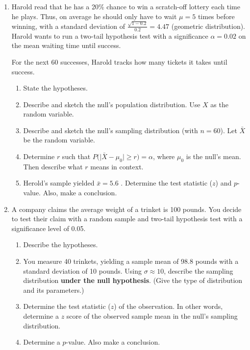\documentclass[12pt,letterpaper]{article}
\begin{document}
\begin{enumerate}
\newpage


\item Harold read that he has a 20\% chance to win a scratch-off lottery each time he plays. Thus, on average he should only have to wait $\mu=5$ times before winning, with a standard deviation of $\frac{\sqrt{1-0.2}}{0.2}=4.47$ (geometric distribution). Harold wants to run a two-tail hypothesis test with a significance $\alpha=0.02$ on the mean waiting time until success. 

For the next 60 successes, Harold tracks how many tickets it takes until success. 

\begin{enumerate}
\item State the hypotheses.
\vfill
\item Describe and sketch the null's population distribution. Use $X$ as the random variable.
\vfill
\item Describe and sketch the null's sampling distribution (with $n=60$). Let $\bar{X}$ be the random variable.
\vfill
\item Determine $r$ such that $P\Big(\big|\bar{X}-\mu_0\big| \ge r \Big) = \alpha$, where $\mu_0$ is the null's mean. Then describe what $r$ means in context.
\vfill
\item Herold's sample yielded $\bar{x} = 5.6$ . Determine the test statistic ($z$) and $p$-value. Also, make a conclusion.
\vfill
\end{enumerate}







\newpage


\item A company claims the average weight of a trinket is 100 pounds. You decide to test their claim with a random sample and two-tail hypothesis test with a significance level of 0.05.
\begin{enumerate}
\item Describe the hypotheses.
\vfill
\item You measure 40 trinkets, yielding a sample mean of 98.8 pounds with a standard deviation of 10 pounds. Using $\sigma \approx 10$, describe the sampling distribution {\bf under the null hypothesis}. (Give the type of distribution and its parameters.)
\vfill
\item Determine the test statistic ($z$) of the observation. In other words, determine a $z$ score of the observed sample mean in the null's sampling distribution.
\vfill
\item Determine a $p$-value. Also make a conclusion.
\vfill
\end{enumerate}


\end{enumerate}
\end{document}

